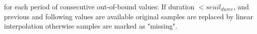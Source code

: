 for each period of consecutive out-of-bound values:\newline
\indent If duration $< seuil_{duree}$, and previous and
following values are available \newline
\hspace*{2cm} original samples are replaced by linear interpolation\newline
otherwise\newline
\hspace*{2cm} samples are marked as "missing".

